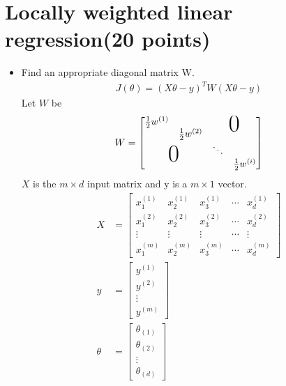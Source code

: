 \documentclass{article}
\begin{document}
\section{Locally weighted linear regression(20 points)}
\begin{itemize}
    \item Find an appropriate diagonal matrix W.\\
\begin{align*}
    J(\theta) = (X \theta - y)^{T}W(X\theta - y)
\end{align*}
Let $W$ be\\
\begin{align*}
  W = \begin{bmatrix}
  \frac{1}{2}w^{(1)} \\
  &\frac{1}{2}w^{(2)} & \multicolumn{2}{c}{\raisebox{1.3ex}[0pt]{\Huge0}}\\
  & & \ddots & \\
  \multicolumn{2}{c}{\raisebox{1.3ex}[0pt]{\Huge0}}
  & &\frac{1}{2}w^{(i)}
\end{bmatrix}
\end{align*}
$X$ is the $m \times d$ input matrix and y is a $m \times 1$ vector.\\
\begin{align*}
    X &= \begin{bmatrix}
    x_{1}^{(1)} & x_{2}^{(1)} & x_{3}^{(1)} &\cdots & x_{d}^{(1)}\\
    x_{1}^{(2)} & x_{2}^{(2)} & x_{3}^{(2)} &\cdots & x_{d}^{(2)}\\
    \vdots&\vdots&\vdots&\cdots&\vdots\\
    x_{1}^{(m)} & x_{2}^{(m)} & x_{3}^{(m)} &\cdots & x_{d}^{(m)}
    \end{bmatrix}\\
    y &= \begin{bmatrix}
    y^{(1)}\\
    y^{(2)}\\
    \vdots\\
    y^{(m)}
    \end{bmatrix}\\
    \theta &= \begin{bmatrix}
    \theta_{(1)}\\
    \theta_{(2)}\\
    \vdots\\
    \theta_{(d)}
    \end{bmatrix}
\end{align*}
\begin{align*}

\end{align*}
\end{itemize}
\end{document}
